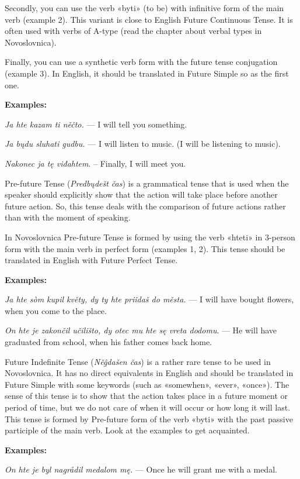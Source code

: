 Secondly, you can use the verb «byti» (to be) with infinitive form of the main verb (example 2). This variant is close to English Future Continuous Tense. It is often used with verbs of A-type (read the chapter about verbal types in Novoslovnica).

Finally, you can use a synthetic verb form with the future tense conjugation (example 3). In English, it should be translated in Future Simple so as the first one.

\textbf{Examples:}

\textit{Ja hte kazam ti něčto.} — I will tell you something.

\textit{Ja bųdu sluhati gudbu.} — I will listen to music. (I will be listening to music).

\textit{Nakonec ja tę viđahtem}. – Finally, I will meet you.

Pre-future Tense (\textit{Predbųdešt čas}) is a grammatical tense that is used when the speaker should explicitly show that the action will take place before another future action. So, this tense deals with the comparison of future actions rather than with the moment of speaking.

In Novoslovnica Pre-future Tense is formed by using the verb «hteti» in 3-person form with the main verb in perfect form (examples 1, 2). This tense should be translated in English with Future Perfect Tense.

\textbf{Examples:}

\textit{Ja hte sòm kupil květy, dy ty hte priǐdaš do města.} — I will have bought flowers, when you come to the place.

\textit{On hte je zakončil učilišto, dy otec mu hte sę vreta dodomu}. — He will have graduated from school, when his father comes back home.

Future Indefinite Tense (\textit{Něĝdašen čas}) is a rather rare tense to be used in Novoslovnica. It has no direct equivalents in English and should be translated in Future Simple with some keywords (such as «somewhen», «ever», «once»). The sense of this tense is to show that the action takes place in a future moment or period of time, but we do not care of when it will occur or how long it will last.
This tense is formed by Pre-future form of the verb «byti» with the past passive participle of the main verb. Look at the examples to get acquainted.

\textbf{Examples:}

\textit{On hte je byl nagrådil medalom mę.} — Once he will grant me with a medal.


